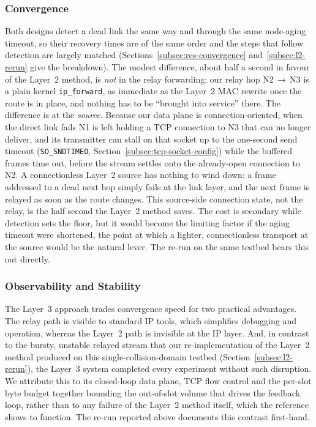 \subsubsection{Convergence}

Both designs detect a dead link the same way and through
the same node-aging timeout, so their recovery times are of the same order and
the steps that follow detection are largely matched (Sections~\ref{subsec:res-convergence}
and~\ref{subsec:l2-rerun} give the breakdown). The modest difference, about half
a second in favour of the Layer~2 method, is \emph{not} in the relay forwarding:
our relay hop N2\,$\to$\,N3 is a plain kernel \texttt{ip\_forward}, as immediate
as the Layer~2 MAC rewrite once the route is in place, and nothing has to be
``brought into service'' there. The difference is at the \emph{source}. Because
our data plane is connection-oriented, when the direct link fails N1 is left
holding a TCP connection to N3 that can no longer deliver, and its transmitter
can stall on that socket up to the one-second send timeout
(\texttt{SO\_SNDTIMEO}, Section~\ref{subsec:tcp-socket-config}) while the
buffered frames time out, before the stream settles onto the already-open
connection to N2. A connectionless
Layer~2 source has nothing to wind down: a frame addressed to a dead next hop
simply fails at the link layer, and the next frame is relayed as soon as the
route changes. This source-side connection state, not the relay, is the half
second the Layer~2 method saves. The cost is secondary while detection sets the
floor, but it would become the limiting factor if the aging timeout were
shortened, the point at which a lighter, connectionless transport at the source
would be the natural lever. The re-run on the same testbed bears this out
directly.

\subsubsection{Observability and Stability}

The Layer~3 approach trades convergence
speed for two practical advantages. The relay path is visible to standard IP
tools, which simplifies debugging and operation, whereas the Layer~2 path is
invisible at the IP layer. And, in contrast to the bursty, unstable relayed
stream that our re-implementation of the Layer~2 method produced on this
single-collision-domain testbed (Section~\ref{subsec:l2-rerun}), the Layer~3
system completed every experiment without such disruption. We attribute this to
its closed-loop data plane, TCP flow control and the per-slot byte budget
together bounding the out-of-slot volume that drives the feedback loop, rather
than to any failure of the Layer~2 method itself, which the reference shows to
function. The re-run reported above documents this contrast first-hand.


